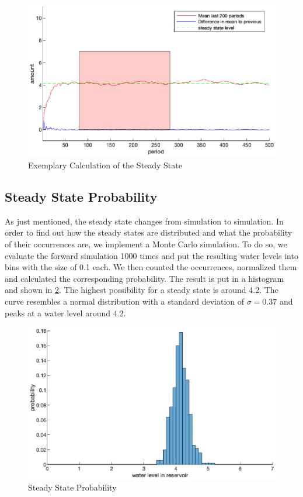 \documentclass[12pt, a4paper, oneside]{article}
\begin{document}
\begin{figure}[ht]
	\includegraphics[width=1\textwidth]{figures/steadyState.eps}
	\caption{Exemplary Calculation of the Steady State}
	\label{fig:steadyState}
\end{figure}

\subsection{Steady State Probability}
As just mentioned, the steady state changes from simulation to simulation. 
In order to find out how the steady states are distributed and what the probability of their occurrences are, we implement a Monte Carlo simulation. 
To do so, we evaluate the forward simulation 1000 times and put the resulting water levels into bins with the size of 0.1 each. 
We then counted the occurrences, normalized them and calculated the corresponding probability.
The result is put in a histogram and shown in \ref{fig:steadyStateMonteCarlo}.
The highest possibility for a steady state is around 4.2. 
The curve resembles a normal distribution with a standard deviation of $\sigma=0.37$ and peaks at a water level around $4.2$.

\begin{figure}[ht]
	\includegraphics[width=1\textwidth]{figures/steadyStateMonteCarlo.eps}
	\caption{Steady State Probability}
	\label{fig:steadyStateMonteCarlo}
\end{figure}
\end{document}
